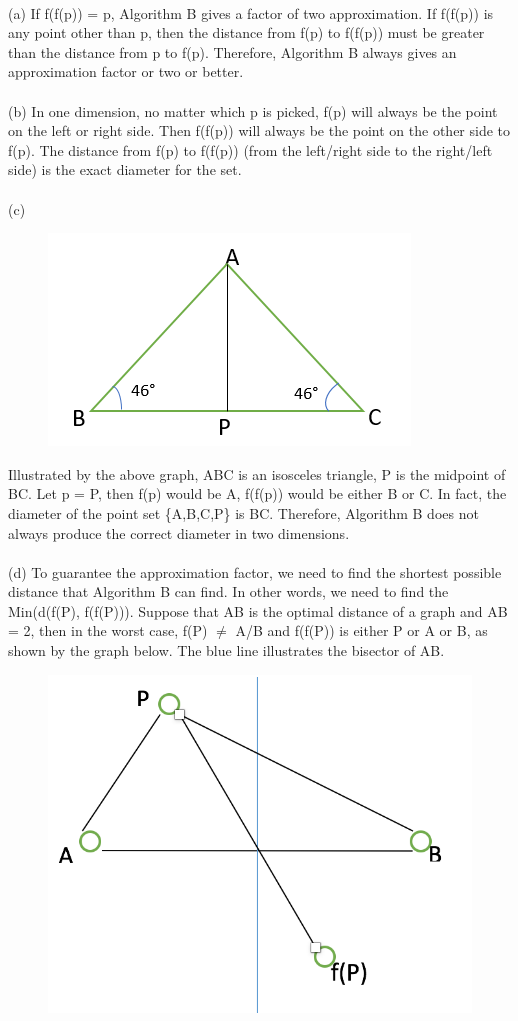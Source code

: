 \begin{problem}{5} ~\\
(a) If f(f(p)) = p, Algorithm B gives a factor of two approximation. If f(f(p)) is any point other than p, then the distance from f(p) to f(f(p)) must be greater than the distance from p to f(p). Therefore, Algorithm B always gives an approximation factor or two or better.\\
\\
(b) In one dimension, no matter which p is picked, f(p) will always be the point on the left or right side. Then f(f(p)) will always be the point on the other side to f(p). The distance from f(p) to f(f(p)) (from the left/right side to the right/left side) is the exact diameter for the set.\\
\\
(c)\begin{figure}[H] 
\centering 
\includegraphics[width=0.6\columnwidth]{1}
\end{figure}
Illustrated by the above graph, ABC is an isosceles triangle, P is the midpoint of BC. Let p = P, then f(p) would be A, f(f(p)) would be either B or C. In fact, the diameter of the point set \{A,B,C,P\} is BC. Therefore, Algorithm B does not always produce the correct diameter in two dimensions.\\
\\
(d) To guarantee the approximation factor, we need to find the shortest possible distance that Algorithm B can find. In other words, we need to find the Min(d(f(P), f(f(P))). Suppose that AB is the optimal distance of a graph and AB = 2, then in the worst case, f(P) $\neq$ A/B and f(f(P)) is either P or A or B, as shown by the graph below. The blue line illustrates the bisector of AB.
\begin{figure}[H] 
\centering 
\includegraphics[width=0.5\columnwidth]{2}

\end{figure}
\end{problem}
